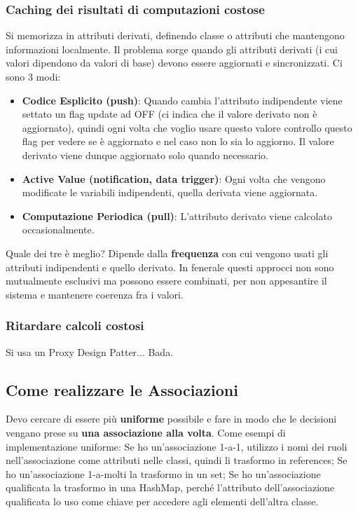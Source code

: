             \subsubsection{Caching dei risultati di computazioni costose}
                Si memorizza in attributi derivati, definendo classe o attributi che mantengono informazioni localmente. Il problema sorge quando gli attributi derivati (i cui valori dipendono da valori di base) devono essere aggiornati e sincronizzati. Ci sono 3 modi:
                \begin{itemize}
                    \item \textbf{Codice Esplicito (push)}: Quando cambia l'attributo indipendente viene settato un flag update ad OFF (ci indica che il valore derivato non è aggiornato), quindi ogni volta che voglio usare questo valore controllo questo flag per vedere se è aggiornato e nel caso non lo sia lo aggiorno. Il valore derivato viene dunque aggiornato solo quando necessario.
                    \item \textbf{Active Value (notification, data trigger)}: Ogni volta che vengono modificate le variabili indipendenti, quella derivata viene aggiornata.
                    \item \textbf{Computazione Periodica (pull)}: L'attributo derivato viene calcolato occasionalmente.
                \end{itemize}   
                    
                Quale dei tre è meglio? Dipende dalla \textbf{frequenza} con cui vengono usati gli attributi indipendenti e quello derivato. In fenerale questi approcci non sono mutualmente esclusivi ma possono essere combinati, per non appesantire il sistema e mantenere coerenza fra i valori.
                    
            \subsubsection{Ritardare calcoli costosi}
                Si usa un Proxy Design Patter... Bada.
                    
        \subsection{Come realizzare le Associazioni}
            Devo cercare di essere più \textbf{uniforme} possibile e fare in modo che le decisioni vengano prese su \textbf{una associazione alla volta}. Come esempi di implementazione uniforme: Se ho un'associazione 1-a-1, utilizzo i nomi dei ruoli nell'associazione come attributi nelle classi, quindi li trasformo in references; Se ho un'associazione 1-a-molti la trasformo in un set; Se ho un'associazione qualificata la trasformo in una HashMap, perché l'attributo dell'associazione qualificata lo uso come chiave per accedere agli elementi dell'altra classe.
            
